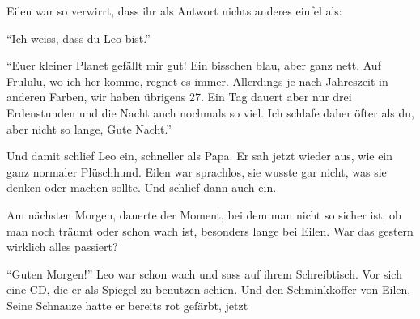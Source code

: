Eilen war so verwirrt, dass ihr als Antwort nichts anderes einfel als:

\enquote{Ich weiss, dass du Leo bist.}

\enquote{Euer kleiner Planet gefällt mir gut! Ein bisschen blau, aber ganz nett. Auf Frululu, wo ich her komme, regnet es immer. Allerdings je nach Jahreszeit in anderen Farben, wir haben übrigens 27. Ein Tag dauert aber nur drei Erdenstunden und die Nacht auch nochmals so viel. Ich schlafe daher öfter als du, aber nicht so lange, Gute Nacht.}

Und damit schlief Leo ein, schneller als Papa. Er sah jetzt wieder aus, wie ein ganz normaler Plüschhund. Eilen war sprachlos, sie wusste gar nicht, was sie denken oder machen sollte. Und schlief dann auch ein.


Am nächsten Morgen, dauerte der Moment, bei dem man nicht so sicher ist, ob man noch träumt oder schon wach ist, besonders lange bei Eilen. War das gestern wirklich alles passiert?

\enquote{Guten Morgen!} Leo war schon wach und sass auf ihrem Schreibtisch. Vor sich eine CD, die er als Spiegel zu benutzen schien. Und den Schminkkoffer von Eilen. Seine Schnauze hatte er bereits rot gefärbt, jetzt 








\vfill
